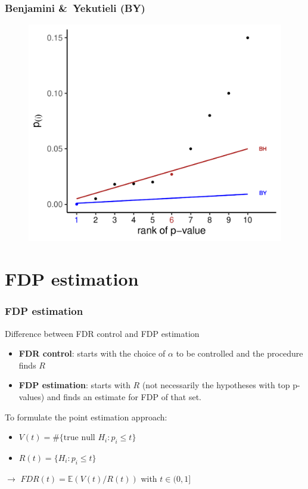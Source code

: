 \documentclass[xcolor={pdftex,dvipsnames,table}]{beamer}
\newcommand{\rbf}[1]{\textcolor{redUnipd}{ #1}}
\begin{document}
\begin{frame}
\frametitle{Benjamini \&\ Yekutieli (BY)}
    \begin{figure}
    \centering
    \includegraphics[width = .8\textwidth]{Slides/MTP/plaatjes/BH_BY.pdf}
\end{figure}
\end{frame}


\section{FDP estimation}

\begin{frame}
\frametitle{FDP estimation}
\rbf{Difference between FDR control and FDP estimation}
\begin{itemize}
    \item \textbf{FDR control}: starts with the choice of $\alpha$ to be controlled and the procedure finds $R$
    \item \textbf{FDP estimation}: starts with $R$ (not necessarily the hypotheses with top p-values) and finds an estimate for FDP of that set.  
\end{itemize}

To formulate the point estimation approach:
\begin{itemize}
    \item $V(t) = \# \{ \text{true null } H_i: p_i \le t\}$
    \item $R(t) = \{H_i: p_i \leq t\}$
\end{itemize}
$\rightarrow$ $FDR(t) = \mathbb{E}(V(t) /R(t))$   with $t \in (0, 1]$

\end{frame}
\end{document}
